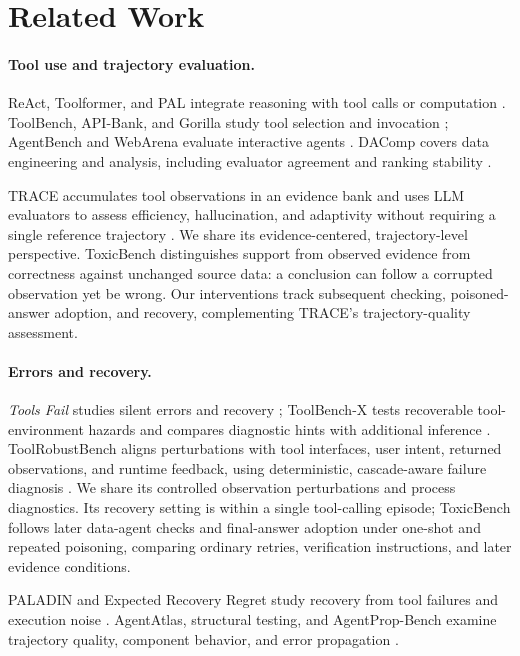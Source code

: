 \section{Related Work}
\label{sec:related}

\paragraph{Tool use and trajectory evaluation.}
ReAct, Toolformer, and PAL integrate reasoning with tool calls or computation \citep{yao2023react,schick2023toolformer,gao2023pal}. ToolBench, API-Bank, and Gorilla study tool selection and invocation \citep{qin2023toolllm,li2023apibank,patil2024gorilla}; AgentBench and WebArena evaluate interactive agents \citep{liu2023agentbench,zhou2023webarena}. DAComp covers data engineering and analysis, including evaluator agreement and ranking stability \citep{lei2025dacomp}.

TRACE accumulates tool observations in an evidence bank and uses LLM evaluators to assess efficiency, hallucination, and adaptivity without requiring a single reference trajectory \citep{kim2025trace}. We share its evidence-centered, trajectory-level perspective. ToxicBench distinguishes support from observed evidence from correctness against unchanged source data: a conclusion can follow a corrupted observation yet be wrong. Our interventions track subsequent checking, poisoned-answer adoption, and recovery, complementing TRACE's trajectory-quality assessment.

\paragraph{Errors and recovery.}
\emph{Tools Fail} studies silent errors and recovery \citep{sun2024toolsfail}; ToolBench-X tests recoverable tool-environment hazards and compares diagnostic hints with additional inference \citep{tian2026toolbenchx}. ToolRobustBench aligns perturbations with tool interfaces, user intent, returned observations, and runtime feedback, using deterministic, cascade-aware failure diagnosis \citep{zheng2026toolrobustbench}. We share its controlled observation perturbations and process diagnostics. Its recovery setting is within a single tool-calling episode; ToxicBench follows later data-agent checks and final-answer adoption under one-shot and repeated poisoning, comparing ordinary retries, verification instructions, and later evidence conditions.

PALADIN and Expected Recovery Regret study recovery from tool failures and execution noise \citep{vuddanti2025paladin,vuddanti2026err}. AgentAtlas, structural testing, and AgentProp-Bench examine trajectory quality, component behavior, and error propagation \citep{mazaheri2026agentatlas,kohl2026structural,gurram2026agentprop}.

